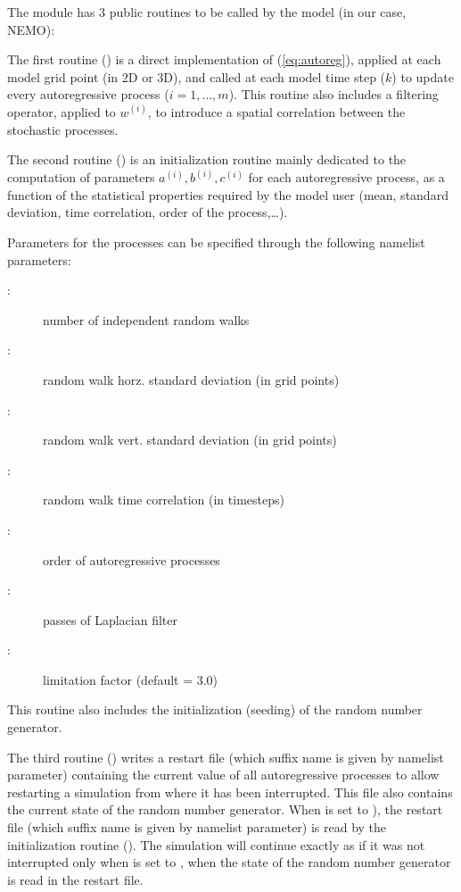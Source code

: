 \documentclass[../main/NEMO_manual]{subfiles}
\begin{document}
The  module has 3 public routines to be called by the model (in our case, NEMO):

The first routine () is a direct implementation of (\autoref{eq:autoreg}),
applied at each model grid point (in 2D or 3D), and called at each model time step ($k$) to
update every autoregressive process ($i=1,\ldots,m$).
This routine also includes a filtering operator, applied to $w^{(i)}$,
to introduce a spatial correlation between the stochastic processes.

The second routine () is an initialization routine mainly dedicated to
the computation of parameters $a^{(i)}, b^{(i)}, c^{(i)}$ for each autoregressive process,
as a function of the statistical properties required by the model user
(mean, standard deviation, time correlation, order of the process,\ldots). 

Parameters for the processes can be specified through the following  namelist parameters:
\begin{description}
\item[:]   number of independent random walks
\item[:] random walk horz. standard deviation (in grid points)
\item[:]  random walk vert. standard deviation (in grid points)
\item[:]  random walk time correlation (in timesteps)
\item[:]   order of autoregressive processes
\item[:]   passes of Laplacian filter
\item[:]   limitation factor (default = 3.0)
\end{description}
This routine also includes the initialization (seeding) of the random number generator.

The third routine () writes a restart file
(which suffix name is given by  namelist parameter) containing the current value of
all autoregressive processes to allow restarting a simulation from where it has been interrupted.
This file also contains the current state of the random number generator.
When  is set to ),
the restart file (which suffix name is given by  namelist parameter) is read by
the initialization routine ().
The simulation will continue exactly as if it was not interrupted only
when  is set to ,
\ie when the state of the random number generator is read in the restart file.

\biblio

\pindex
\end{document}
